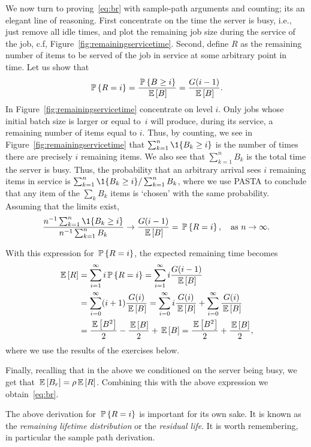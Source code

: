 We now turn to proving~\eqref{eq:br} with sample-path arguments and
counting; its an elegant line of reasoning. First concentrate on the
time the server is busy, i.e., just remove all idle times, and plot
the remaining job size during the service of the job, c.f,
Figure~\ref{fig:remainingservicetime}. Second, define $R$ as the
remaining number of items to be served of the job in service at some
arbitrary point in time. Let us show that
\begin{equation*}
  \P{R=i} =\frac{\P{B\geq i}}{\E B} = \frac{G(i-1)}{\E B}.
\end{equation*}
In Figure~\ref{fig:remainingservicetime} concentrate on level
$i$. Only jobs whose initial batch size is larger or equal to~$i$ will
produce, during its service, a remaining number of items equal to $i$.
Thus, by counting, we see in Figure~\ref{fig:remainingservicetime}
that $\sum_{k=1}^n \1{B_k \geq i}$ is the number of times there are
precisely $i$ remaining items.  We also see  that
$\sum_{k=1}^n B_k$ is the total time the server is busy. Thus, the
probability that an arbitrary arrival sees $i$ remaining items in
service is $\sum_{k=1}^n \1{B_k \geq i}/\sum_{k=1}^n B_k$, where we
use PASTA to conclude that any item of the $\sum_{k} B_k$ items is
`chosen' with the same probability.  Assuming that the limits exist,
\begin{equation*}
  \frac{n^{-1}\sum_{k=1}^n \1{B_k \geq i}}{n^{-1}\sum_{k=1}^n B_k} \to \frac{G(i-1)}{\E B} = \P{R=i}, \quad \text{as  } n\to\infty.
\end{equation*}

With this expression for $\P{R=i}$, the expected remaining time becomes
\begin{equation*}
  \begin{split}
  \E{R} 
&= \sum_{i=1}^\infty i \P{R=i} = \sum_{i=1}^\infty i \frac{G(i-1)}{\E B} \\
&=\sum_{i=0}^\infty (i+1) \frac{G(i)}{\E B} 
=\sum_{i=0}^\infty i \frac{G(i)}{\E B} +
\sum_{i=0}^\infty \frac{G(i)}{\E B}\\
&= \frac{\E{B^2}}2 - \frac{\E B}2 + \E B = \frac{\E{B^2}}2 + \frac{\E B}2,
  \end{split}
\end{equation*}
where we use the results of the exercises below.

Finally, recalling that in the above we conditioned on the server
being busy, we get that $\E{B_r} = \rho \E R$.  Combining this with
the above expression we obtain~\eqref{eq:br}.

\begin{remark}
  The above derivation for $\P{R=i}$ is important for its own sake. It
  is known as the \emph{remaining lifetime distribution} or the
  \emph{residual life}. It is worth remembering, in particular the
  sample path derivation. 
\end{remark}

